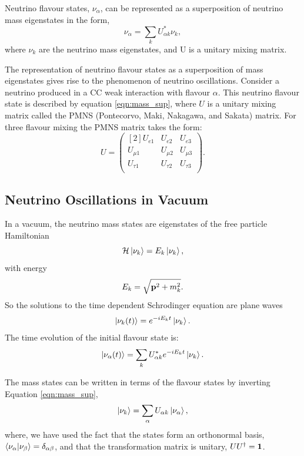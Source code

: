 Neutrino flavour states, $\nu_\alpha$, can be represented as a superposition of 
neutrino mass eigenstates in the form,
\begin{equation}
	\label{eqn:mass_sup}
	\nu_\alpha = \sum_{k} U^*_{\alpha k} \nu_k,
\end{equation}
where $\nu_k$ are the neutrino mass eigenstates, and U is a unitary mixing
matrix. 

The representation of neutrino flavour states as a superposition of mass 
eigenstates gives rise to the phenomenon of neutrino oscillations. Consider a 
neutrino produced in a CC weak interaction with flavour \(\alpha\). 
This neutrino flavour state is described by equation \ref{eqn:mass_sup},
where \(U\) is a unitary mixing matrix called the PMNS 
(Pontecorvo, Maki, Nakagawa, and Sakata) matrix. For three flavour mixing the 
PMNS matrix takes the form:
\begin{equation*}
	U = 
	\begin{pmatrix}[2]
		U_{e1} & U_{e2} & U_{e3} \\
		U_{\mu1} & U_{\mu2} & U_{\mu3} \\
		U_{\tau1} & U_{\tau2} & U_{\tau3} \\
	\end{pmatrix}.
\end{equation*}

\subsection{Neutrino Oscillations in Vacuum}
In a vacuum, the neutrino mass states are eigenstates of the free particle Hamiltonian
\begin{equation*}
	{\cal H} \ket{\nu_k} = E_k \ket{\nu_k},
\end{equation*}
with energy
\begin{equation*}
	E_k = \sqrt{\vb{p}^2 + m_k^2}.
\end{equation*}
So the solutions to the time dependent Schrodinger equation are plane waves
\begin{equation*}
	\ket{\nu_k(t)} = e^{-iE_kt}\ket{\nu_k}.
\end{equation*}
The time evolution of the initial flavour state is:
\begin{equation}
	\label{eqn:flavour_time_mass}
	\ket{\nu_\alpha(t)} = \sum_k U_{\alpha k}^* e^{-iE_kt} \ket{\nu_k}.
\end{equation}

The mass states can be written in terms of the flavour states by inverting
Equation \ref{eqn:mass_sup},
\begin{equation}
	\label{eqn:flav_sup}
	\ket{\nu_k} = \sum_\alpha U_{\alpha k} \ket{\nu_\alpha},
\end{equation}
where, we have used the fact that the states form an orthonormal basis,
\(\braket{\nu_\alpha}{\nu_\beta} = \delta_{\alpha \beta}\), and that the 
transformation matrix is unitary, \(UU^\dagger = \vb{1}\).

